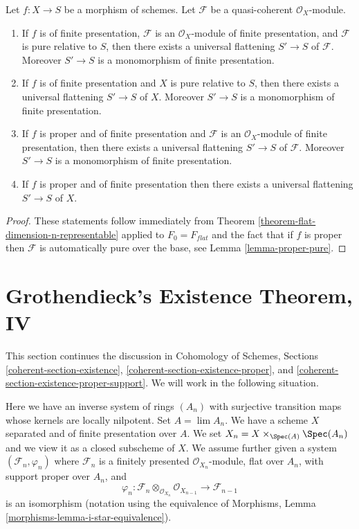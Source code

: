 \begin{lemma}
\label{lemma-when-universal-flattening}
Let $f : X \to S$ be a morphism of schemes.
Let $\mathcal{F}$ be a quasi-coherent $\mathcal{O}_X$-module.
\begin{enumerate}
\item If $f$ is of finite presentation, $\mathcal{F}$ is an
$\mathcal{O}_X$-module of finite presentation, and $\mathcal{F}$ is
pure relative to $S$, then there exists a universal flattening
$S' \to S$ of $\mathcal{F}$. Moreover $S' \to S$ is a monomorphism
of finite presentation.
\item If $f$ is of finite presentation and $X$ is pure relative to $S$,
then there exists a universal flattening $S' \to S$ of $X$.
Moreover $S' \to S$ is a monomorphism of finite presentation.
\item If $f$ is proper and of finite presentation and $\mathcal{F}$ is an
$\mathcal{O}_X$-module of finite presentation, then there exists a
universal flattening $S' \to S$ of $\mathcal{F}$. Moreover $S' \to S$ is
a monomorphism of finite presentation.
\item If $f$ is proper and of finite presentation
then there exists a universal flattening $S' \to S$ of $X$.
\end{enumerate}
\end{lemma}

\begin{proof}
These statements follow immediately from
Theorem \ref{theorem-flat-dimension-n-representable}
applied to $F_0 = F_{flat}$
and the fact that if $f$ is proper then $\mathcal{F}$ is automatically
pure over the base, see
Lemma \ref{lemma-proper-pure}.
\end{proof}







\section{Grothendieck's Existence Theorem, IV}
\label{section-existence}

\noindent
This section continues the discussion in
Cohomology of Schemes, Sections \ref{coherent-section-existence},
\ref{coherent-section-existence-proper}, and
\ref{coherent-section-existence-proper-support}.
We will work in the following situation.

\begin{situation}
\label{situation-existence}
Here we have an inverse system of rings $(A_n)$ with surjective transition
maps whose kernels are locally nilpotent. Set $A = \lim A_n$. We have a
scheme $X$ separated and of finite presentation over $A$.
We set $X_n = X \times_{\Spec(A)} \Spec(A_n)$ and we
view it as a closed subscheme of $X$. We assume further given a system
$(\mathcal{F}_n, \varphi_n)$ where $\mathcal{F}_n$ is a finitely presented
$\mathcal{O}_{X_n}$-module, flat over $A_n$, with support proper over $A_n$,
and
$$
\varphi_n :
\mathcal{F}_n \otimes_{\mathcal{O}_{X_n}} \mathcal{O}_{X_{n - 1}}
\longrightarrow
\mathcal{F}_{n - 1}
$$
is an isomorphism (notation using the equivalence of
Morphisms, Lemma \ref{morphisms-lemma-i-star-equivalence}).
\end{situation}

